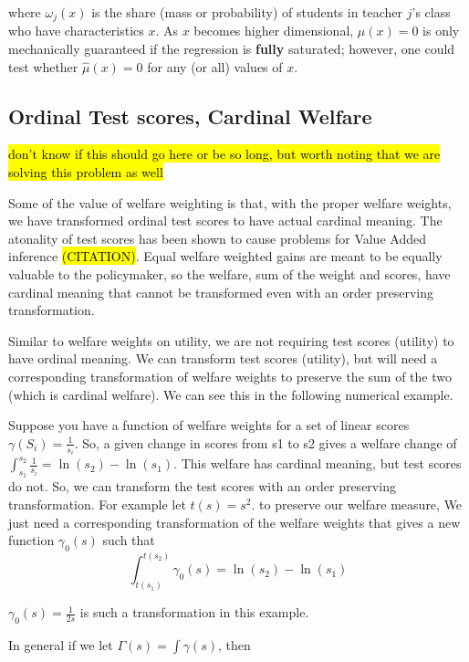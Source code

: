 \documentclass{article}
\theoremstyle{definition}
\theoremstyle{definition}
\theoremstyle{definition}
\theoremstyle{definition}
\begin{document}
    \noindent where $\omega_j(x)$ is the share (mass or probability) of students in teacher $j$'s class who have characteristics $x$. As $x$ becomes higher dimensional, $\mu(x)=0$ is only mechanically guaranteed if the regression is \textbf{fully} saturated; however, one could test whether $\hat{\mu}(x)=0$ for any (or all) values of $x$.
    
   \subsection{Ordinal Test scores, Cardinal Welfare}
   \hl{don't know if this should go here or be so long, but worth noting that we are solving this problem as well }
        
    Some of the value of welfare weighting is that, with the proper welfare weights, we have transformed ordinal test scores to have actual cardinal meaning. The atonality of test scores has been shown to cause problems for Value Added inference \hl{(CITATION)}. Equal welfare weighted gains are meant to be equally valuable to the policymaker, so the welfare, sum of the weight and scores, have cardinal meaning that cannot be transformed even with an order preserving transformation. 
    
    Similar to welfare weights on utility, we are not requiring test scores (utility) to have ordinal meaning. We can transform test scores (utility), but will need a corresponding transformation of welfare weights to preserve the sum of the two (which is cardinal welfare). We can see this in the following numerical example. 
    
    Suppose you have a function of welfare weights for a set of linear scores $\gamma(S_i) = \frac{1}{s_i}$. So, a given change in scores from s1 to s2 gives a welfare change of $\int_{s_1}^{s_2} \frac{1}{s_i} = \ln(s_2)-\ln(s_1)$. This welfare has cardinal meaning, but test scores do not. So, we can transform the test scores with an order preserving transformation. For example let $t(s) = s^2$. to preserve our welfare measure, We just need a corresponding transformation of the welfare weights that gives a new function $\gamma_0(s)$ such that 
    $$\int_{t(s_1)}^{t(s_2)}\gamma_0(s)  = \ln(s_2)-\ln(s_1)$$
    
    $\gamma_0(s) = \frac{1}{2s}$ is such a transformation in this example. 
    
    In general if we let $\Gamma(s) = \int \gamma(s)$, then 
    
\end{document}
